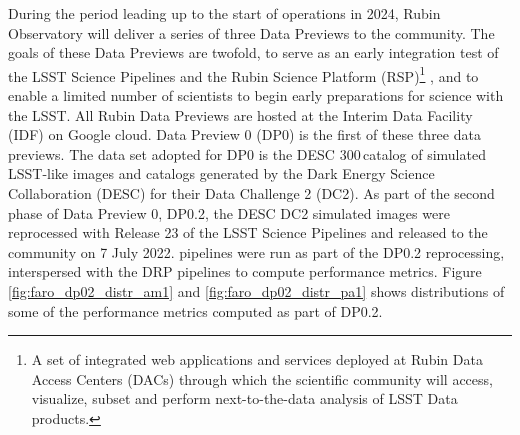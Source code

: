 During the period leading up to the start of operations in 2024, Rubin Observatory will deliver a series of three Data Previews to the community. 
The goals of these Data Previews are twofold, to serve as an early integration test of the LSST Science Pipelines and the Rubin Science Platform (RSP)\footnote{A set of integrated web applications and services deployed at Rubin Data Access Centers (DACs) through which the scientific community will access, visualize, subset and perform next-to-the-data analysis of LSST Data products.} \cite{lse-319}, and to enable a limited number of scientists to begin early preparations for science with the LSST.
All  Rubin Data Previews are hosted at the Interim Data Facility (IDF) on Google cloud\cite{2021arXiv211115030O}.
Data Preview 0 (DP0) \cite{RTN-001} is the first of these three data previews.
The data set adopted for DP0 is the DESC 300\,\degsq catalog of simulated LSST-like images and catalogs generated by the Dark Energy Science Collaboration (DESC) for their Data Challenge 2 (DC2)\cite{2021ApJS..253...31L}.
As part of the second phase of Data Preview 0, DP0.2, the DESC DC2 simulated images were reprocessed with Release 23 of the LSST Science Pipelines and released to the community on 7 July 2022.
\faro pipelines were run as part of the DP0.2 reprocessing, interspersed with the DRP pipelines to compute performance metrics. 
Figure \ref{fig:faro_dp02_distr_am1} and   \ref{fig:faro_dp02_distr_pa1} shows distributions of some of the performance metrics computed as part of DP0.2.
